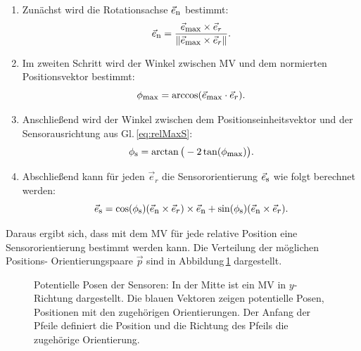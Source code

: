 \begin{enumerate}

    \item Zunächst wird die Rotationsachse $\vec{e}_{\textrm{\footnotesize{n}}}$ bestimmt:
    \begin{equation}
        \vec{e}_{\textrm{\footnotesize{n}}} = \frac{\vec{e}_{\textrm{\footnotesize{max}}} \times \vec{e}_r }{\|\vec{e}_{\textrm{\footnotesize{max}}} \times \vec{e}_{\textrm{\footnotesize{$r$}}}\|}.
        \label{eq:formel15}
    \end{equation}
    
    \item Im zweiten Schritt wird der Winkel zwischen MV und dem normierten Positionsvektor bestimmt:
    \begin{equation}
        \phi_{\textrm{\footnotesize{max}}} = \arccos(\vec{e}_{\textrm{\footnotesize{max}}} \cdot \vec{e}_{\textrm{\footnotesize{$r$}}}).
        \label{eq:formel16}
    \end{equation}
    
    \item Anschließend wird der Winkel zwischen dem Positionseinheitsvektor und der Sensorausrichtung aus Gl.\,\ref{eq:relMaxS}:
    \begin{equation}
        \phi_{\textrm{\footnotesize{s}}} = \arctan\big(-2\tan(\phi_{\textrm{\footnotesize{max}}})\big).
        \label{eq:formel17}
    \end{equation}
    
    \item  Abschließend kann für jeden $\vec e_r$ die Sensororientierung $\vec e_{\textrm{\footnotesize{s}}}$ wie folgt berechnet werden:
    \begin{equation}
        \vec{e}_{\textrm{\footnotesize{s}}} = \cos(\phi_{\textrm{\footnotesize{s}}})(\vec{e}_{\textrm{\footnotesize{n}}} \times \vec{e}_{\textrm{\footnotesize{$r$}}})\times \vec{e}_{\textrm{\footnotesize{n}}} + \sin(\phi_{\textrm{\footnotesize{s}}}) (\vec{e}_{\textrm{\footnotesize{n}}} \times\vec{e}_{\textrm{\footnotesize{$r$}}}).
        \label{eq:formel18}
    \end{equation}
    \end{enumerate} 

Daraus ergibt sich, dass mit dem MV für jede relative Position eine Sensororientierung bestimmt werden kann. Die Verteilung der möglichen Positions- Orientierungspaare $\vec{p}$ sind in Abbildung\,\ref{fig:PotentialPoses} dargestellt.
    
    \begin{figure}[h]
        \centering
        \caption{Potentielle Posen der Sensoren: In der Mitte ist ein MV in $y$-Richtung dargestellt. Die blauen Vektoren zeigen potentielle Posen, Positionen mit den zugehörigen Orientierungen. Der Anfang der Pfeile definiert die Position und die Richtung des Pfeils die zugehörige Orientierung.}
        \label{fig:PotentialPoses}
    \end{figure} 

